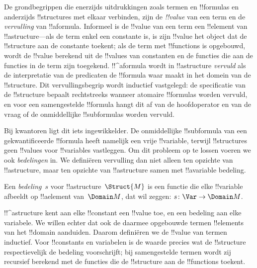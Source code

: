 \documentclass[../../../include/open-logic-section]{subfiles}
\begin{document}


\begin{explain}
De grondbegrippen die enerzijds uitdrukkingen zoals termen en
!!{formula}s en anderzijds !!{structure}s met elkaar verbinden, zijn
de \emph{!!{value}} van een term en de \emph{vervulling} van
!!a{formula}. Informeel is de !!{value} van een term een !!{element} van
!!a{structure}---als de term enkel een constante is, is zijn !!{value}
het object dat de !!{structure} aan de constante toekent; als de term
met !!{function}s is opgebouwd, wordt de !!{value} berekend uit de
!!{value}s van constanten en de functies die aan de functies in de term
zijn toegekend. !!^a{formula} wordt in !!a{structure} \emph{vervuld} als
de interpretatie van de predicaten de !!{formula} waar maakt in het
domein van de !!{structure}. Dit vervullingsbegrip wordt inductief
vastgelegd: de specificatie van de !!{structure} bepaalt rechtstreeks
wanneer atomaire !!{formula}s worden vervuld, en voor een samengestelde
!!{formula} hangt dit af van de hoofdoperator en van de vraag of de
onmiddellijke !!{subformula}s worden vervuld.

Bij kwantoren ligt dit iets ingewikkelder. De onmiddellijke
!!{subformula} van een gekwantificeerde !!{formula} heeft namelijk een
vrije !!{variable}, terwijl !!{structure}s geen !!{value}s voor
!!{variable}s vastleggen. Om dit probleem op te lossen voeren we ook
\emph{bedelingen} in. We definiëren vervulling dan niet alleen ten
opzichte van !!a{structure}, maar ten opzichte van !!a{structure}
samen met !!a{variable} bedeling.
\end{explain}

\begin{defn}[Bedeling]
Een \emph{bedeling}~$s$ voor !!a{structure}~$\Struct{M}$ is een
functie die elke !!{variable} afbeeldt op !!a{element} van~$\Domain M$,
dat wil zeggen: $s\colon \Var \to \Domain M$.
\end{defn}

\begin{explain}
!!^a{structure} kent aan elke !!{constant} een !!{value} toe, en een
bedeling aan elke variabele. We willen echter dat ook de daarmee
opgebouwde termen !!{element}s van het !!{domain} aanduiden. Daarom
definiëren we de !!{value} van termen inductief. Voor !!{constant}s en
variabelen is de waarde precies wat de !!{structure} respectievelijk de
bedeling voorschrijft; bij samengestelde termen wordt zij recursief
berekend met de functies die de !!{structure} aan de !!{function}s
toekent.
\end{explain}
\end{document}
